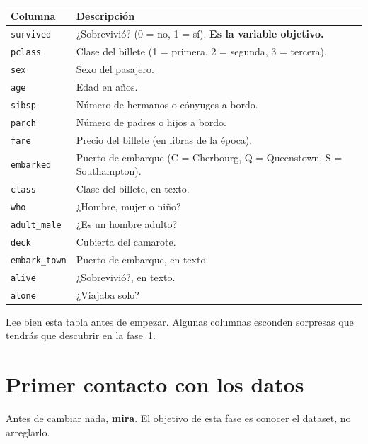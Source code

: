 \documentclass[11pt,a4paper]{article}
\newcommand{\col}[1]{\texttt{#1}}
\begin{document}
\begin{tabularx}{\textwidth}{@{}l X@{}}
\toprule
\textbf{Columna} & \textbf{Descripción} \\
\midrule
\col{survived}    & ¿Sobrevivió? (0 = no, 1 = sí). \textbf{Es la variable objetivo.} \\
\col{pclass}      & Clase del billete (1 = primera, 2 = segunda, 3 = tercera). \\
\col{sex}         & Sexo del pasajero. \\
\col{age}         & Edad en años. \\
\col{sibsp}       & Número de hermanos o cónyuges a bordo. \\
\col{parch}       & Número de padres o hijos a bordo. \\
\col{fare}        & Precio del billete (en libras de la época). \\
\col{embarked}    & Puerto de embarque (C = Cherbourg, Q = Queenstown, S = Southampton). \\
\col{class}       & Clase del billete, en texto. \\
\col{who}         & ¿Hombre, mujer o niño? \\
\col{adult\_male} & ¿Es un hombre adulto? \\
\col{deck}        & Cubierta del camarote. \\
\col{embark\_town}& Puerto de embarque, en texto. \\
\col{alive}       & ¿Sobrevivió?, en texto. \\
\col{alone}       & ¿Viajaba solo? \\
\bottomrule
\end{tabularx}

\begin{nota}
Lee bien esta tabla antes de empezar. Algunas columnas esconden sorpresas que tendrás
que descubrir en la fase~1.
\end{nota}

\section{Primer contacto con los datos}

Antes de cambiar nada, \textbf{mira}. El objetivo de esta fase es conocer el dataset,
no arreglarlo.
\end{document}
